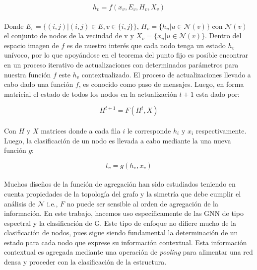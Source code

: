 	\begin{equation}
		h_v = f(x_v, E_v, H_v, X_v)
	\end{equation}
	\\
	Donde $E_v = \{(i, j)| (i, j) \in E, v \in \{i, j\}\}$,  $H_v = \{h_u| u \in \mathcal{N}(v)\}$ con $\mathcal{N}(v)$ el conjunto de nodos de la vecindad de v y $X_v = \{x_u| u \in \mathcal{N}(v)\}$. Dentro del espacio imagen de $f$ es de nuestro interés que cada nodo tenga un estado $h_v$ unívoco, por lo que apoyándose en el teorema del punto fijo \citep{brown1988fixed} es posible encontrar en un proceso iterativo de actualizaciones con determinados parámetros para nuestra función $f$ este $h_v$ contextualizado. El proceso de actualizaciones llevado a cabo dado una función $f$, es conocido como paso de mensajes. Luego, en forma matricial el estado de todos los nodos en la actualización $t+1$ esta dado por:
	
	\begin{equation}
		H^{t+1} = F(H^t, X)
	\end{equation} 
	\\
	Con $H$ y $X$ matrices donde a cada fila $i$ le corresponde $h_i \text{ y } x_i$ respectivamente. Luego, la clasificación de un nodo es llevada a cabo mediante la una nueva función $g$:	
	
	\begin{equation}
		t_v = g(h_v, x_v)
	\end{equation}
	\\
	Muchos diseños de la función de agregación han sido estudiados \citep{kipf2017semisupervised} teniendo en cuenta propiedades de la topología del grafo y la simetría que debe cumplir el análisis de $\mathcal{N}$ i.e., $F$ no puede ser sensible al orden de agregación de la información. En este trabajo, hacemos uso específicamente de las GNN de tipo espectral \citep{Wu_2021} y la clasificación de G. Este tipo de enfoque no difiere mucho de la clasificación de nodos, pues sigue siendo fundamental la determinación de un estado para cada nodo que exprese su información contextual. Esta información contextual es agregada mediante una operación de \textit{pooling} para alimentar una red densa y proceder con la clasificación de la estructura.
	
%
%	
